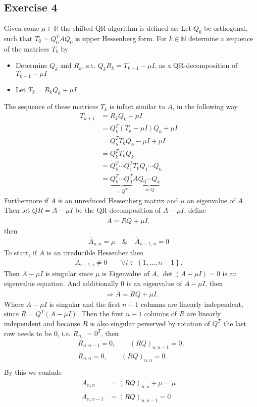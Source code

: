 \subsection{Exercise 4}
Given some $\mu \in \mathbb{R}$ the shifted QR-algorithm is defined as: Let
$Q_0$ be orthogonal, such that $T_0 =  Q_0^T A Q_0$ is upper Hessenberg form.
For $k \in \mathbb{N}$ determine a sequence of the matrices $T_k$ by
\begin{itemize}
    \item Determine $Q_k$ and $R_k$, s.t. $Q_k R_k = T_{k-1} - \mu I$, as a
        QR-decomposition of $T_{k-1} - \mu I$
    \item Let $T_k = R_k Q_k + \mu I$
\end{itemize}
The sequence of these matrices $T_k$ is infact similar to $A$, in the
following way
\begin{align}
    T_{k+1}
    &= R_k Q_k + \mu I \\
    &= Q_k^T ( T_k - \mu I) Q_k + \mu I\\
    &= Q_k^T T_k Q_k - \mu I + \mu I\\
    &= Q_k^T T_k Q_k\\
    &= Q_k^T \cdots Q_1^T T_0 Q_1 \cdots Q_k\\
    &= \underbrace{Q_k^T \cdots Q_0^T}_{=Q^T} A \underbrace{Q_0 \cdots Q_k}_{= Q}
\end{align}
Furthermore if $A$ is an unreduced Hessenberg matrix and $\mu$ an eigenvalue
of $A$. Then let $QR = A-\mu I$ be the QR-decomposition of $A-\mu I $, define
\begin{align}
  \overline{A} = RQ  + \mu I,
\end{align}
then
\begin{align}
    \overline{A}_{n,n} = \mu \quad \& \quad \overline{A}_{n-1, n} = 0
\end{align}
To start, if $A$ is an irreducible Hessenber then
\begin{align}
    A_{i+1, i} \neq 0 \qquad \forall i \in \left\{ 1, \ldots , n-1 \right\}.
\end{align}
Then $A-\mu I$ is singular since $\mu$ is Eigenvalue of $A$, $\det(A-\mu I)
=0 $ is an eigenvalue equation. And additionally $0$ is an eigenvalue of $A -
\mu I$, then
\begin{align}
     &\Rightarrow \overline{A} = RQ + \mu I.
\end{align}
Where $A-\mu I$ is singular and the first  $n-1$ columns are linearly
independent, since $R = Q^T(A-\mu I)$. Then the first $n-1$ columns of $R$
are linearly independent and because $R$ is also singular perserved by
rotation of $Q^T$ the last row needs to be $0$, i.e. $R_{n, \cdot} = 0^T$,
then
\begin{align}
    &R_{n,n-1} = 0,\qquad (RQ)_{n, n-1} = 0,\\
    &R_{n,n} = 0,\qquad (RQ)_{n, n} = 0.\\
\end{align}
By this we conlude
\begin{align}
    \overline{A}_{n,n} &= (RQ)_{n,n}+\mu = \mu\\
    \overline{A}_{n, n-1} &= (RQ)_{n,n-1} = 0
\end{align}




